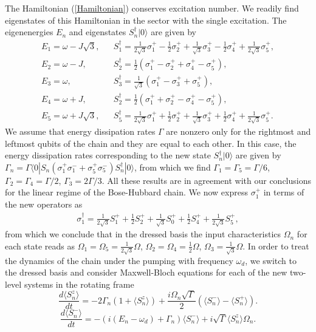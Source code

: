 \documentclass[%
 aps, pra,
 amsmath,amssymb,
 preprint,%
superscriptaddress
]{revtex4-2}
\begin{document}
The Hamiltonian (\ref{Hamiltonian}) conserves excitation number. We readily find eigenstates of this Hamiltonian in the sector with the single excitation. The eigenenergies $E_n$ and eigenstates $S_n^{\dagger} |0\rangle$ are given by
\begin{eqnarray}
E_1 = \omega - J \sqrt{3}, &&
S_1^{\dagger}=\frac{1}{2\sqrt{3}}\sigma_1^{+} - \frac{1}{2}\sigma_2^{+} + \frac{1}{\sqrt{3}}\sigma_3^{+} - \frac{1}{2}\sigma_4^{+} + \frac{1}{2\sqrt{3}}\sigma_5^{+},
\\ \nonumber
E_2 = \omega - J , &&
S_2^{\dagger}=\frac{1}{2}\left(\sigma_1^{+} - \sigma_2^{+} + \sigma_4^{+} - \sigma_5^{+}\right),
\\ \nonumber
E_3 = \omega, &&
S_3^{\dagger}=\frac{1}{\sqrt{3}}\left(\sigma_1^{+} - \sigma_3^{+} + \sigma_5^{+}\right),
\\ \nonumber
E_4 = \omega + J , &&
S_2^{\dagger}=\frac{1}{2}\left(\sigma_1^{+} + \sigma_2^{+} - \sigma_4^{+} - \sigma_5^{+}\right),
\\ \nonumber
E_5 = \omega + J \sqrt{3}, &&
S_5^{\dagger}=\frac{1}{2\sqrt{3}}\sigma_1^{+} + \frac{1}{2}\sigma_2^{+} + \frac{1}{\sqrt{3}}\sigma_3^{+} + \frac{1}{2}\sigma_4^{+} + \frac{1}{2\sqrt{3}}\sigma_5^{+}.
\label{Eigen}
\end{eqnarray}
We assume that energy dissipation rates $\Gamma$ are nonzero only for the rightmost and leftmost qubits of the chain and they are equal to each other. In this case, the energy dissipation rates corresponding to the new state $S_n^{\dagger} |0\rangle$ are given by $\Gamma_n=\Gamma \langle 0 |S_n (\sigma_1^{+} \sigma_1^{-} +  \sigma_5^{+} \sigma_5^{-} )S_n^{\dagger} |0\rangle$, from which we find $\Gamma_1=\Gamma_5 = \Gamma /6$, $\Gamma_2=\Gamma_4= \Gamma/2$, $\Gamma_3= 2\Gamma /3$. All these results are in agreement with our conclusions for the linear regime of the Bose-Hubbard chain. We now express $\sigma_1^{+}$ in terms of the new operators as
\begin{eqnarray}
\sigma_1^{\dagger}=\frac{1}{2\sqrt{3}}S_1^{+} + \frac{1}{2}S_2^{+} + \frac{1}{\sqrt{3}}S_0^{+} + \frac{1}{2}S_4^{+} + \frac{1}{2\sqrt{3}}S_5^{+},
\label{sigma1}
\end{eqnarray}
from which we conclude that in the dressed basis the input
characteristics $\Omega_{n}$ for each state reads as $\Omega_{1}=\Omega_{5}=\frac{1}{2\sqrt{3}}\Omega$, $\Omega_{2}=\Omega_{4}=\frac{1}{2}\Omega$, $\Omega_{3}=\frac{1}{\sqrt{3}}\Omega$. In order to treat the dynamics of the chain under the pumping with frequency $\omega_d$,
we switch to the
dressed basis and consider Maxwell-Bloch equations for each of the new
two-level systems in the rotating frame
\begin{equation}
\frac{d \langle S_n^{z} \rangle}{dt} = -2\Gamma_n \left(1+
\langle S_n^{z} \rangle \right) +  \frac{i \Omega_n \sqrt{\Gamma}}{2}
\left(\langle S_n^{-} \rangle  -
\langle S_n^{+} \rangle \right). \label{sigmaz}
\end{equation}
\begin{equation}
\frac{d \langle S_n^{-} \rangle}{dt} = -\left(i (E_n-\omega_d) +
\Gamma_n\right) \langle S_n^{-} \rangle + i
\sqrt{\Gamma} \langle S_n^{z} \rangle \Omega_n.
\label{sigmaminus}
\end{equation}
\end{document}
